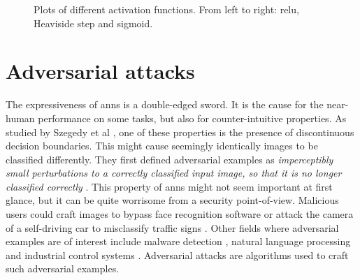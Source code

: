 \begin{figure}
\centering
{}
\caption[Activiation functions]{Plots of different activation functions. From left to right: \gls{relu}, Heaviside step and sigmoid.}
\label{fig:activation_functions}
\end{figure}

\section{Adversarial attacks}
The expressiveness of \glspl{ann} is a double-edged sword. It is the cause for the near-human performance on some tasks, but also for counter-intuitive properties. As studied by Szegedy et al \cite{szegedy2014intriguing}, one of these properties is the presence of discontinuous decision boundaries. This might cause seemingly identically images to be classified differently. They first defined adversarial examples as \textit{imperceptibly small perturbations to a correctly classified input image, so that it is no longer classified correctly} \cite{szegedy2014intriguing}. This property of \glspl{ann} might not seem important at first glance, but it can be quite worrisome from a security point-of-view. Malicious users could craft images to bypass face recognition software \cite{face_recognition} or attack the camera of a self-driving car to misclassify traffic signs \cite{traffic_signs}. Other fields where adversarial examples are of interest include malware detection \cite{malware_detection}, natural language processing \cite{adversarial_nlp} and industrial control systems \cite{adversarial_industrial_control_system}. Adversarial attacks are algorithms used to craft such adversarial examples.\\ 

